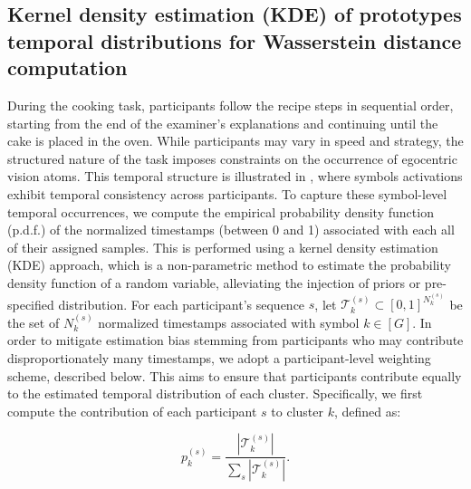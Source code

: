 \begin{chapterabstract}
    
    \subsection{Kernel density estimation (KDE) of prototypes temporal distributions for Wasserstein distance computation}
        \label{sec:chapter_6_kde_temporal_distributions}



        During the cooking task, participants follow the recipe steps in sequential order, starting from the end of the examiner’s explanations and continuing until the cake is placed in the oven. While participants may vary in speed and strategy, the structured nature of the task imposes constraints on the occurrence of egocentric vision atoms. This temporal structure is illustrated in , where symbols activations exhibit temporal consistency across participants. To capture these symbol-level temporal occurrences, we compute the empirical probability density function (p.d.f.) of the normalized timestamps (between 0 and 1) associated with each all of their assigned samples. This is performed using a kernel density estimation (KDE) approach, which is a non-parametric method to estimate the probability density function of a random variable, alleviating the injection of priors or pre-specified distribution. For each participant's sequence $s$, let $\mathcal{T}^{(s)}_k \subset [0, 1]^{N^{(s)}_k}$ be the set of $N^{(s)}_k$ normalized timestamps associated with symbol $k \in [G]$. In order to mitigate estimation bias stemming from participants who may contribute disproportionately many timestamps, we adopt a participant-level weighting scheme, described below. This aims to ensure that participants contribute equally to the estimated temporal distribution of each cluster. Specifically, we first compute the contribution of each participant $s$ to cluster $k$, defined as:
        
        \[
        p^{(s)}_k = \frac{|\mathcal{T}^{(s)}_k|}{\sum_{s} \left| \mathcal{T}^{(s)}_k \right|}.
        \]


\end{chapterabstract}
